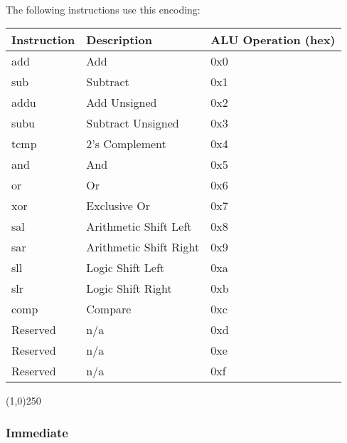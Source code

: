 \documentclass[letterpaper, 11pt]{article}
\begin{document}
\paragraph{}The following instructions use this encoding:\\
\begin{center}
	\begin{longtable}{|l|l|l|}\hline
			Instruction & Description 				& ALU Operation (hex) \\ \hline
			add			& Add 						& 0x0 \\ \hline
			sub 		& Subtract					& 0x1 \\ \hline
			addu 		& Add Unsigned 				& 0x2 \\ \hline
			subu		& Subtract Unsigned 		& 0x3 \\ \hline
			tcmp		& 2's Complement			& 0x4 \\ \hline
			and			& And						& 0x5 \\ \hline
			or			& Or						& 0x6 \\ \hline
			xor			& Exclusive Or				& 0x7 \\ \hline
			sal			& Arithmetic Shift Left		& 0x8 \\ \hline
			sar			& Arithmetic Shift Right	& 0x9 \\ \hline
			sll			& Logic Shift Left			& 0xa \\ \hline
			slr			& Logic Shift Right			& 0xb \\ \hline
			comp		& Compare					& 0xc \\ \hline
			Reserved	& n/a						& 0xd \\ \hline
			Reserved	& n/a						& 0xe \\ \hline
			Reserved	& n/a						& 0xf \\ \hline

\end{longtable}
\end{center}
\begin{center}
	\line(1,0){250}
\end{center}
\subsubsection{Immediate}
\end{document}
